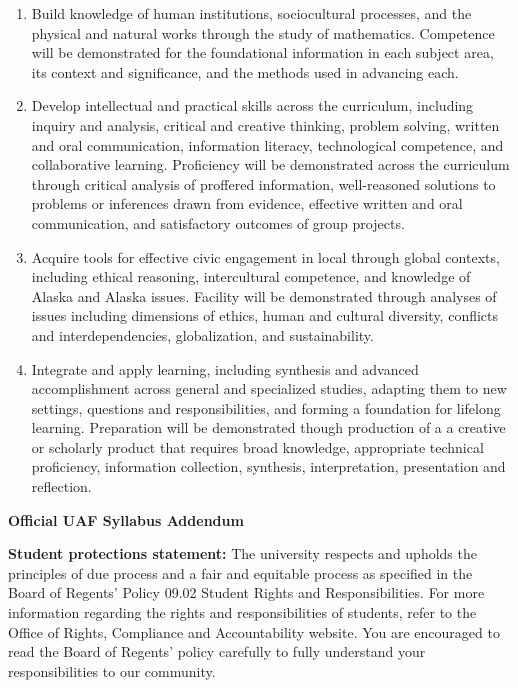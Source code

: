 \documentclass[11pt]{article}
\renewcommand{\emph}[1]{\textsf{\textbf{#1}}}
\newcommand{\localhead}[1]{\par\smallskip\textbf{#1} \smallskip\nobreak\\}%
\def\heading#1{\localhead{\large\emph{#1}}}
\begin{document}
\begin{enumerate}
\item Build knowledge of human institutions, sociocultural processes, and the physical and natural works through the study of mathematics.  Competence will be demonstrated for the foundational information in each subject area, its context and significance, and the methods used in advancing each.

\item Develop intellectual and practical skills across the curriculum, including inquiry and analysis, critical and creative thinking, problem solving, written and oral communication, information literacy, technological competence, and collaborative learning. Proficiency will be demonstrated across the curriculum through critical analysis of proffered information, well-reasoned solutions to problems or inferences drawn from evidence, effective written and oral communication, and satisfactory outcomes of group projects.

\item Acquire tools for effective civic engagement in local through global contexts, including ethical reasoning, intercultural competence, and knowledge of Alaska and Alaska issues.  Facility will be demonstrated through analyses of issues including dimensions of ethics, human and cultural diversity, conflicts and interdependencies, globalization, and sustainability.   

\item Integrate and apply learning, including synthesis and advanced accomplishment across general and specialized studies, adapting them to new settings, questions and responsibilities, and forming a foundation for lifelong learning. Preparation will be demonstrated though production of a a creative or scholarly product that requires broad knowledge, appropriate technical proficiency, information collection, synthesis, interpretation, presentation and reflection.
\end{enumerate}


\begin{center}
\heading{Official UAF Syllabus Addendum}
\end{center}


\noindent\emph{Student protections statement:} The university respects and upholds the principles of due process and a fair and equitable process as specified in the Board of Regents' Policy 09.02 Student Rights and Responsibilities. For more information regarding the rights and responsibilities of students, refer to the Office of Rights, Compliance and Accountability website. You are encouraged to read the Board of Regents' policy carefully to fully understand your responsibilities to our community.
\end{document}
